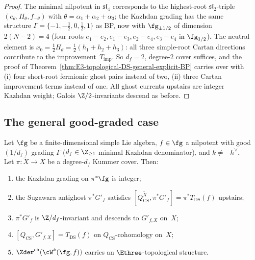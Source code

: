 \begin{proof}
The minimal nilpotent in $\mathfrak{sl}_{4}$ corresponds to the
highest-root $\mathfrak{sl}_{2}$-triple $(e_{\theta}, H_{\theta},
f_{-\theta})$ with $\theta = \alpha_{1} + \alpha_{2} + \alpha_{3}$;
the Kazhdan grading has the same structure
$\Gamma = \{-1, -\tfrac{1}{2}, 0, \tfrac{1}{2}, 1\}$ as BP, now
with $\fg_{\pm 1/2}$ of dimension $2(N-2) = 4$ (four roots
$e_{1}-e_{2}, e_{1}-e_{3}, e_{2}-e_{4}, e_{3}-e_{4}$ in
$\fg_{1/2}$). The
neutral element is $x_{0} = \tfrac{1}{2}H_{\theta} =
\tfrac{1}{2}(h_{1} + h_{2} + h_{3})$: all three simple-root Cartan
directions contribute to the improvement~$T_{\mathrm{imp}}$. So
$d_{f} = 2$, degree-$2$ cover suffices, and the proof of
Theorem~\ref{thm:E3-topological-DS-general-explicit-BP} carries
over with (i) four short-root fermionic ghost pairs instead of two,
(ii) three Cartan improvement terms instead of one. All ghost
currents upstairs are integer Kazhdan weight; Galois
$\Z/2$-invariants descend as before.
\end{proof}

\subsection{The general good-graded case}
\label{subsec:fractional-ghost-all-good-graded}

\begin{theorem}
\label{thm:E3-topological-DS-general-all-good-graded}
Let $\fg$ be a finite-dimensional simple Lie algebra,
$f \in \fg$ a nilpotent with good $(1/d_{f})$-grading
$\Gamma$ \textup{(}$d_{f} \in \Z_{\ge 1}$ minimal Kazhdan
denominator\textup{)}, and $k \ne -h^{\vee}$. Let
$\pi\colon \widetilde X \to X$ be a degree-$d_{f}$ Kummer cover.
Then:
\begin{enumerate}[label=\textup{(\arabic*)},nosep]
\item the Kazhdan grading on $\pi^{*}\fg$ is integer;
\item the Sugawara antighost $\pi^{*}G'_{f}$ satisfies
 $[Q_{\mathrm{CS}}^{\widetilde X}, \pi^{*}G'_{f}]
 = \pi^{*}T_{\mathrm{DS}}(f)$ upstairs;
\item $\pi^{*}G'_{f}$ is $\Z/d_{f}$-invariant and descends to
 $G'_{f, X}$ on~$X$;
\item $[Q_{\mathrm{CS}}, G'_{f, X}] = T_{\mathrm{DS}}(f)$ on
 $Q_{\mathrm{CS}}$-cohomology on~$X$;
\item $\Zder^{\mathrm{ch}}(\cW^{k}(\fg, f))$ carries an
 $\Ethree$-topological structure.
\end{enumerate}
\end{theorem}

